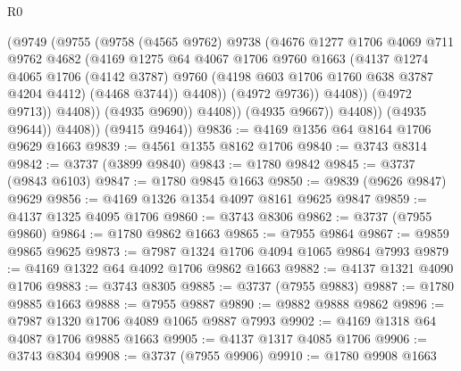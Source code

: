 \begin{lexlean}{R0}
\begin{coremodule}
                              (@9749
                                (@9755
                                  (@9758
                                    (@4565 @9762)
                                    @9738
                                    (@4676
                                      @1277
                                      @1706
                                      @4069
                                      @711
                                      @9762
                                      @4682
                                      (@4169
                                        @1275
                                        @64
                                        @4067
                                        @1706
                                        @9760
                                        @1663
                                        (@4137
                                          @1274
                                          @4065
                                          @1706
                                          (@4142 @3787)
                                          @9760
                                          (@4198 @603 @1706 @1760 @638 @3787 @4204 @4412)
                                          (@4468 @3744))
                                        @4408))
                                    (@4972 @9736))
                                  @4408))
                              (@4972 @9713))
                            @4408))
                        (@4935 @9690))
                      @4408))
                  (@4935 @9667))
                @4408))
            (@4935 @9644))
          @4408))
      (@9415 @9464))
@9836 := @4169 @1356 @64 @8164 @1706 @9629 @1663
@9839 := @4561 @1355 @8162 @1706
@9840 := @3743 @8314
@9842 := @3737 (@3899 @9840)
@9843 := @1780 @9842
@9845 := @3737 (@9843 @6103)
@9847 := @1780 @9845 @1663
@9850 := @9839 (@9626 @9847) @9629
@9856 := @4169 @1326 @1354 @4097 @8161 @9625 @9847
@9859 := @4137 @1325 @4095 @1706
@9860 := @3743 @8306
@9862 := @3737 (@7955 @9860)
@9864 := @1780 @9862 @1663
@9865 := @7955 @9864
@9867 := @9859 @9865 @9625
@9873 := @7987 @1324 @1706 @4094 @1065 @9864 @7993
@9879 := @4169 @1322 @64 @4092 @1706 @9862 @1663
@9882 := @4137 @1321 @4090 @1706
@9883 := @3743 @8305
@9885 := @3737 (@7955 @9883)
@9887 := @1780 @9885 @1663
@9888 := @7955 @9887
@9890 := @9882 @9888 @9862
@9896 := @7987 @1320 @1706 @4089 @1065 @9887 @7993
@9902 := @4169 @1318 @64 @4087 @1706 @9885 @1663
@9905 := @4137 @1317 @4085 @1706
@9906 := @3743 @8304
@9908 := @3737 (@7955 @9906)
@9910 := @1780 @9908 @1663

\end{coremodule}
\end{lexlean}
